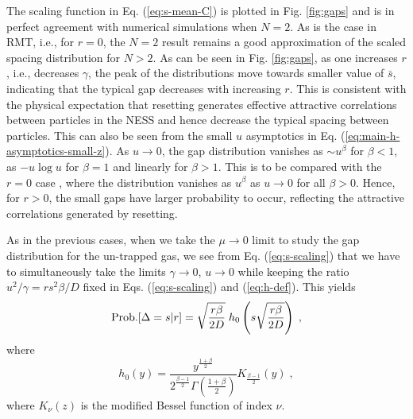 \documentclass[onecolumn,superscriptaddress,
 amsmath,amssymb,
 aps,
 prd,
]{revtex4-1}
\begin{document}
The scaling function in Eq. (\ref{eq:s-mean-C}) is plotted in Fig. \ref{fig:gaps} and is in perfect agreement with numerical simulations when $N = 2$. As is the case in RMT, i.e., for $r=0$, the $N = 2$ result remains a good approximation of the scaled spacing distribution for $N>2$. As can be seen in Fig. \ref{fig:gaps}, as one increases $r$, i.e., decreases $\gamma$, the peak of the distributions move towards smaller value of $\bar{s}$, indicating that the typical gap decreases with increasing $r$. This is consistent with the physical expectation that resetting generates effective attractive correlations between particles in the NESS and hence decrease the typical spacing between particles. This can also be seen from the small $u$ asymptotics in Eq. (\ref{eq:main-h-asymptotics-small-z}). As $u \to 0$, the gap distribution vanishes as $\sim u^\beta$ for $\beta < 1$, as  $-u\log u$ for $\beta = 1$ and linearly for $\beta > 1$. This is to be compared with the $r=0$ case \cite{M91,F10}, where the distribution vanishes as $u^\beta$ as $u \to 0$ for all $\beta>0$. Hence, for $r>0$, the small gaps have larger probability to occur, reflecting the attractive correlations generated by resetting.  





\vspace*{0.3cm}
 As in the previous cases, when we take the $\mu \to 0$ limit to study the gap distribution for the 
un-trapped gas, we see from Eq. (\ref{eq:s-scaling}) that we have to simultaneously take the limits $\gamma \to 0$, $u \to 0$ while keeping the ratio 
$u^2 / \gamma =  r s^2 \beta / D$ fixed in Eqs. (\ref{eq:s-scaling}) and (\ref{eq:h-def}). This yields
{
\begin{equation} \label{eq:gap-mu0}
{\rm Prob.}[\Delta = s | r] = \sqrt{\frac{r \beta}{2 D}} \; h_0\left( s \sqrt{\frac{r \beta}{2 D}} \right) \;,
\end{equation}
}
where
\begin{equation} \label{eq:h0}
h_0(y) =  \frac{y^{\frac{1 + \beta}{2}}}{2^{\frac{\beta - 1}{2}} \Gamma\left( \frac{1+\beta}{2} \right)} K_{\frac{\beta - 1}{2}}\left( y \right) \;,
\end{equation}
where $K_\nu(z)$ is the modified Bessel function of index $\nu$.  
\end{document}
